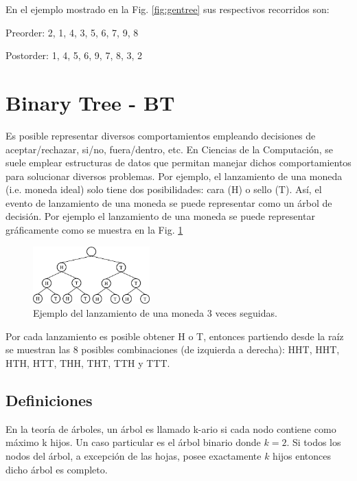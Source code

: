 En el ejemplo mostrado en la Fig. \ref{fig:gentree} sus respectivos recorridos son:

Preorder: 2, 1, 4, 3, 5, 6, 7, 9, 8

Postorder: 1, 4, 5, 6, 9, 7, 8, 3, 2

\section{Binary Tree - BT}

Es posible representar diversos comportamientos empleando decisiones de aceptar/rechazar, si/no, fuera/dentro, etc. En Ciencias de la Computación, se suele emplear estructuras de datos que permitan manejar dichos comportamientos para solucionar diversos problemas. Por ejemplo, el lanzamiento de una moneda (i.e. moneda ideal) solo tiene dos posibilidades: cara (H) o sello (T). Así, el evento de lanzamiento de una moneda se puede representar como un árbol de decisión. Por ejemplo el lanzamiento de una moneda se puede representar gráficamente como se muestra en la Fig. \ref{fig:tree3coins}

\begin{figure}[htpb!]
  \begin{center}
    \includegraphics[width=0.4\textwidth]{images/gen3coins.eps}
  \end{center}
  \caption{Ejemplo del lanzamiento de una moneda 3 veces seguidas.}
  \label{fig:tree3coins}
\end{figure}

Por cada lanzamiento es posible obtener H o T, entonces partiendo desde la raíz se muestran las 8 posibles combinaciones (de izquierda a derecha): HHT, HHT, HTH, HTT, THH, THT, TTH y TTT.

\subsection{Definiciones}

En la teoría de árboles, un árbol es llamado k-ario si cada nodo contiene como máximo k hijos. Un caso particular es el árbol binario donde $k=2$. Si todos los nodos del árbol, a excepción de las hojas, posee exactamente $k$ hijos entonces dicho árbol es completo.

